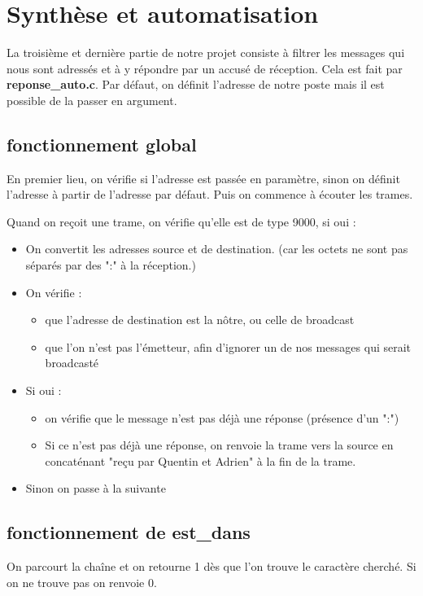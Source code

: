 \documentclass[a4paper,11pt]{article}
\begin{document}
	\section{Synthèse et automatisation}
	
	La troisième et dernière partie de notre projet consiste à filtrer les messages qui nous sont adressés et à y répondre par un accusé de réception. Cela est fait par \textbf{reponse\_auto.c}. Par défaut, on définit l'adresse de notre poste mais il est possible de la passer en argument.
	\subsection{fonctionnement global}
	En premier lieu, on vérifie si l'adresse est passée en paramètre, sinon on définit l'adresse à partir de l'adresse par défaut. 
	Puis on commence à écouter les trames.

	Quand on reçoit une trame, on vérifie qu'elle est de type 9000, si oui : 
	\begin{itemize}
	\item On convertit les adresses source et de destination. (car les octets ne sont pas séparés par des ":" à la réception.)
	\item On vérifie : 
		\begin{itemize}
		\item que l'adresse de destination est la nôtre, ou celle de broadcast
		\item que l'on n'est pas l'émetteur, afin d'ignorer un de nos messages qui serait broadcasté
		\end{itemize}
	\item Si oui :
		\begin{itemize}
		\item on vérifie que le message n'est pas déjà une réponse (présence d'un ":")
		\item Si ce n'est pas déjà une réponse, on renvoie la trame vers la source en concaténant "reçu par Quentin et Adrien" à la fin de la trame.
	\end{itemize}
	\item Sinon on passe à la suivante
	\end{itemize}

	\subsection{fonctionnement de est\_dans}
	On parcourt la chaîne et on retourne 1 dès que l'on trouve le caractère cherché. Si on ne trouve pas on renvoie 0.
	
\end{document}
